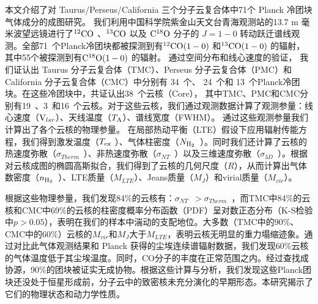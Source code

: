 \documentclass[UTF8, nocolorlinks]{pkuthss}
\newcommand{\coa}{$\rm ^{12}CO$ }
\newcommand{\cob}{$\rm ^{13}CO$ }
\newcommand{\coc}{$\rm C^{18}O$ }
\newcommand{\coaa}{$\rm^{12}CO(1-0)$ }
\newcommand{\cobb}{$\rm^{13}CO(1-0)$ }
\newcommand{\cocc}{$\rm C^{18}O(1-0)$ }
\newcommand{\vlsr}{${\rm V } _{lsr}$}
\newcommand{\ta}{$T_{\rm A}$}
\newcommand{\texc}{$T_{\rm {ex}}$ }
\newcommand{\nhyd}{$N_{\rm H_2}$\ }
\newcommand{\nnhyd}{$n_{\rm H_2}$\ }
\newcommand{\sigmath}{$\sigma _{Therm}$\ }
\newcommand{\sigmant}{$\sigma _{NT}$\ }
\newcommand{\sigmatd}{$\sigma _{3D}$\ }
\newcommand{\numsou}{71\ }
\newcommand{\numsoutmc}{34\ }
\newcommand{\numsoupmc}{13\ }
\newcommand{\numsoucmc}{24\ }
\newcommand{\numcore}{38\ }
\newcommand{\numcoretmc}{19\ }
\newcommand{\numcorepmc}{3\ }
\newcommand{\numcorecmc}{16\ }
\begin{document}
	\frontmatter
	\maketitle

\begin{cabstract}

	本文介绍了对 Taurus/Perseus/California 三个分子云复合体中71个 Planck 冷团块气体成分的成图研究。 我们利用中国科学院紫金山天文台青海观测站的13.7 m 毫米波望远镜进行了\coa、\cob 以及 \coc 分子的 $J=1-0$ 转动跃迁谱线观测。全部\numsou 个Planck冷团块都被探测到有\coaa 和\cobb 的辐射，其中55个被探测到有\cocc 的辐射。 通过空间分布和线心速度的验证， 我们证认出 Taurus 分子云复合体（TMC）、Perseus 分子云复合体（PMC）和 California 分子云复合体（CMC）中分别有 \numsoutmc 个、 \numsoucmc 个和 \numsoupmc 个Planck冷团块。在这些冷团块中，共证认出\numcore 个云核（Core）， 其中TMC、PMC和CMC分别有\numcoretmc、\numcorepmc 和\numcorecmc 个云核。对于这些云核，我们通过观测数据计算了观测参量：线心速度（\vlsr ）、天线温度（\ta ）、谱线宽度（FWHM）。 通过这些观测参量我们计算出了各个云核的物理参量。 在局部热动平衡（LTE）假设下应用辐射传能方程，我们得到激发温度（\texc ）、气体柱密度（\nhyd ）。同时我们还计算了云核的热速度弥散（\sigmath ）、非热速度弥散（\sigmant ）以及三维速度弥散（\sigmatd ）。根据对云核成图的椭圆高斯拟合，我们得到了云核的几何尺度（$R$），从而计算出气体数密度（\nnhyd ）、LTE质量（$M_{LTE}$）、Jeans质量（$M_{J}$）和virial质量（$M_{vir}$）。

	根据这些物理参量，我们发现84\%的云核有：\sigmant $>$\sigmath ，而TMC中84\%的云核和CMC中69\%的云核的柱密度概率分布函数（PDF）呈对数正态分布（K-S检验中$p>0.05$），表明在我们的样本中湍动的支配地位。大多数（TMC中的90\%、CMC中的60\%）云核的$M_{vir}$和$M_{J}$大于$M_{LTE}$，表明云核无明显的重力塌缩迹象。通过对比此气体观测结果和 Planck 获得的尘埃连续谱辐射数据，我们发现60\%云核的气体温度低于其尘埃温度。同时，CO分子的丰度在正常范围之内。经过查找成协源，90\%的团块被证实无成协物。根据这些计算与分析，我们发现这些Planck团块还没处于恒星形成前，分子云中的致密核未充分演化的早期形态。本研究揭示了它们的物理状态和动力学性质。
\end{cabstract}
\end{document}
